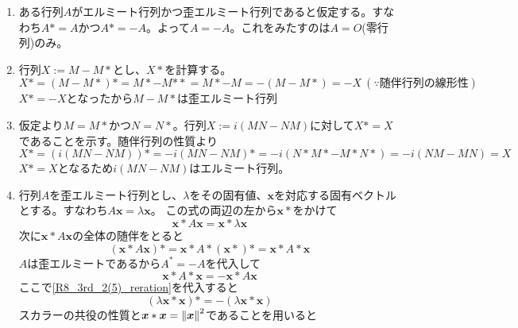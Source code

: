 \documentclass[dvipdfmx]{jsreport}
\begin{document}
\begin{souanswer}
\begin{enumerate}
\begin{equation} \label{R8_3rd_2(2)_diagonal_reration}
	\bar{a_{kk}}= -a_{kk}
\end{equation}
	が成り立つ。ここで$a_{kk}= x+ yi\ (x, y\in \R)$とすると
\begin{equation*}
	\bar{a_{kk}}= x- yi
\end{equation*}
	\ref{R8_3rd_2(2)_digonal_reration}に代入すると
\begin{equation*}
	x- yi= -(x- yi)\iff 2x= 0iff x= 0
\end{equation*}
	よって$a_{kk}= yi$となる。$y\ne 0$のときは純虚数となるため、対角成分は0または純虚数となる。
	\item ある行列$A$がエルミート行列かつ歪エルミート行列であると仮定する。すなわち$A*= A$かつ$A*= -A$。よって$A= -A$。これをみたすのは$A= O$(零行列)のみ。
	\item 行列$X:= M- M*$とし、$X*$を計算する。
\begin{equation*}
	X*= (M- M*)*= M*- M{**}= M* -M= -(M- M*)= -X\ (\because 随伴行列の線形性)
\end{equation*}
	$X*= -X$となったから$M- M*$は歪エルミート行列
	\item 仮定より$M= M*$かつ$N= N*$。行列$X:= i(MN- NM)$に対して$X*= X$であることを示す。随伴行列の性質より
\begin{equation*}
	X*= (i(MN- NM))*= -i(MN- NM)*= -i(N*M*- M*N*)= -i(NM- MN)= X
\end{equation*}
	$X*= X$となるため$i(MN- NM)$はエルミート行列。
	\item 行列$A$を歪エルミート行列とし、$\lambda$をその固有値、$\bm{x}$を対応する固有ベクトルとする。すなわち$A\bm{x}= \lambda\bm{x}$。
	この式の両辺の左から$\bm{x}*$をかけて
\begin{equation} \label{R8_3rd_2(5)_reration}
	\bm{x}*A\bm{x}= \bm{x}*\lambda\bm{x}
\end{equation}
	次に$\bm{x}*A\bm{x}$の全体の随伴をとると
\begin{equation*}
	(\bm{x}*A\bm{x})*= \bm{x}*A*(\bm{x}*)*= \bm{x}*A*\bm{x}
\end{equation*}
	$A$は歪エルミートであるから$A^*= -A$を代入して
\begin{equation*}
	\bm{x}*A*\bm{x}= -\bm{x}*A\bm{x}
\end{equation*}
	ここで\ref{R8_3rd_2(5)_reration}を代入すると
\begin{equation*}
	(\lambda\bm{x}*\bm{x})*= -(\lambda\bm{x}*\bm{x})
\end{equation*}
	スカラーの共役の性質と$\bm{x}*\bm{x}= \left\|\bm{x}\right\|^2$であることを用いると

\end{enumerate}
\end{souanswer}
\end{document}
